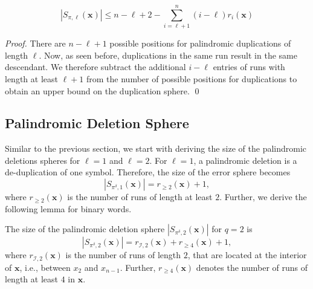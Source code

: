 \documentclass[a4paper]{llncs}
\newcommand{\ve}[1]{\boldsymbol{#1}}
\begin{document}
	\begin{lemma}
		\begin{equation*}
		|S_{\pi, \ell}(\ve{x})| \leq n - \ell + 2 - \sum_{i=\ell+1}^{n} (i-\ell)r_i(\ve{x})
		\end{equation*}
	\end{lemma}
	\begin{proof}
		There are $n-\ell+1$ possible positions for palindromic duplications of length $\ell$. Now, as seen before, duplications in the same run result in the same descendant. We therefore subtract the additional $i-\ell$ entries of runs with length at least $\ell+1$ from the number of possible positions for duplications to obtain an upper bound on the duplication sphere.  \qed
	\end{proof}
	\subsection{Palindromic Deletion Sphere}
	Similar to the previous section, we start with deriving the size of the palindromic deletions spheres for $\ell=1$ and $\ell=2$. For $\ell=1$, a palindromic deletion is a de-duplication of one symbol. Therefore, the size of the error sphere becomes
	\begin{equation}
	|S_{\pi^\delta, 1}(\ve{x})| = r_{\geq 2}(\ve{x}) + 1,
	\end{equation}
	where $r_{\geq 2}(\ve{x})$ is the number of runs of length at least $2$. Further, we derive the following lemma for binary words.
	\begin{lemma} \label{lemma:palindromic_deletion_sphere_l_2}
		The size of the palindromic deletion sphere $|S_{\pi^\delta, 2}(\ve{x})|$ for $q=2$ is
		\begin{equation*}
		|S_{\pi^\delta, 2}(\ve{x})| = r_{\mathcal{I},2}(\ve{x}) + r_{\geq 4}(\ve{x}) + 1,
		\end{equation*}
		where $r_{\mathcal{I},2}(\ve{x})$ is the number of runs of length $2$, that are located at the interior of $\ve{x}$, i.e., between $x_2$ and $x_{n-1}$. Further, $r_{\geq 4}(\ve{x})$ denotes the number of runs of length at least $4$ in $\ve{x}$.
	\end{lemma}
\end{document}
